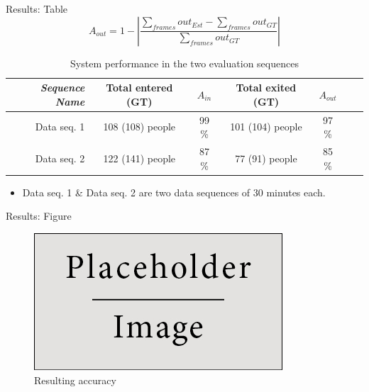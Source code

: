 \documentclass[final,hyperref={pdfpagelabels=false}]{beamer}
\begin{document}
\begin{frame}[t]
\begin{columns}[t]
\begin{column}{.465\textwidth}
\begin{block}{Results: Table}
\begin{equation}
\label{eq:out_accuracy}
A_{out} = 1 - |\frac{\sum_{frames}{out_{Est}}-\sum_{frames}out_{GT}}{\sum_{frames}out_{GT}}| 
\end{equation} 


\begin{table}[h]
\centering
	\begin{tabular}{r | c | c | c | c | c | c }
		\emph{Sequence Name}		&  Total entered (GT) & \emph{$A_{in}$} & Total exited (GT) & \emph{$A_{out}$} \\
		\hline \hline
		Data seq. 1			& 108 (108) people & 99 \% & 101 (104) people & 97 \% \\
		Data seq. 2			& 122 (141) people & 87 \% & 77 (91) people & 85 \%  \\
		\end{tabular}
	\caption{System performance in the two evaluation sequences}
\end{table}

\begin{itemize}
\item Data seq. 1 \& Data seq. 2 are two data sequences of 30 minutes each. 
\end{itemize}
     
\end{block}


\begin{block}{Results: Figure}

\begin{figure}
\includegraphics[width=0.8\linewidth]{placeholder.jpg}
\caption{Resulting accuracy}
\end{figure}

\end{block}



\end{column}
\end{columns}
\end{frame}
\end{document}
